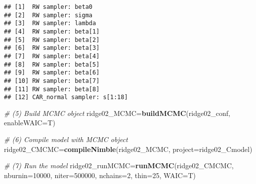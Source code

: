 \documentclass[]{article}
\newenvironment{Shaded}{\begin{snugshade}}{\end{snugshade}}
\newcommand{\CommentTok}[1]{\textcolor[rgb]{0.56,0.35,0.01}{\textit{#1}}}
\newcommand{\DataTypeTok}[1]{\textcolor[rgb]{0.13,0.29,0.53}{#1}}
\newcommand{\DecValTok}[1]{\textcolor[rgb]{0.00,0.00,0.81}{#1}}
\newcommand{\KeywordTok}[1]{\textcolor[rgb]{0.13,0.29,0.53}{\textbf{#1}}}
\newcommand{\NormalTok}[1]{#1}
\newcommand{\OperatorTok}[1]{\textcolor[rgb]{0.81,0.36,0.00}{\textbf{#1}}}
\newcommand{\StringTok}[1]{\textcolor[rgb]{0.31,0.60,0.02}{#1}}
\begin{document}
\begin{Shaded}
\end{Shaded}

\begin{verbatim}
## [1]  RW sampler: beta0
## [2]  RW sampler: sigma
## [3]  RW sampler: lambda
## [4]  RW sampler: beta[1]
## [5]  RW sampler: beta[2]
## [6]  RW sampler: beta[3]
## [7]  RW sampler: beta[4]
## [8]  RW sampler: beta[5]
## [9]  RW sampler: beta[6]
## [10] RW sampler: beta[7]
## [11] RW sampler: beta[8]
## [12] CAR_normal sampler: s[1:18]
\end{verbatim}

\begin{Shaded}
\begin{Highlighting}[]
\CommentTok{# (5) Build MCMC object}
\NormalTok{ridge02_MCMC=}\KeywordTok{buildMCMC}\NormalTok{(ridge02_conf, }\DataTypeTok{enableWAIC=}\NormalTok{T)}

\CommentTok{# (6) Compile model with MCMC object}
\NormalTok{ridge02_CMCMC=}\KeywordTok{compileNimble}\NormalTok{(ridge02_MCMC, }\DataTypeTok{project=}\NormalTok{ridge02_Cmodel)}

\CommentTok{# (7) Run the model}
\NormalTok{ridge02_runMCMC=}\KeywordTok{runMCMC}\NormalTok{(ridge02_CMCMC, }\DataTypeTok{nburnin=}\DecValTok{10000}\NormalTok{, }\DataTypeTok{niter=}\DecValTok{500000}\NormalTok{, }\DataTypeTok{nchains=}\DecValTok{2}\NormalTok{, }\DataTypeTok{thin=}\DecValTok{25}\NormalTok{, }\DataTypeTok{WAIC=}\NormalTok{T)}
\end{Highlighting}
\end{Shaded}
\end{document}
